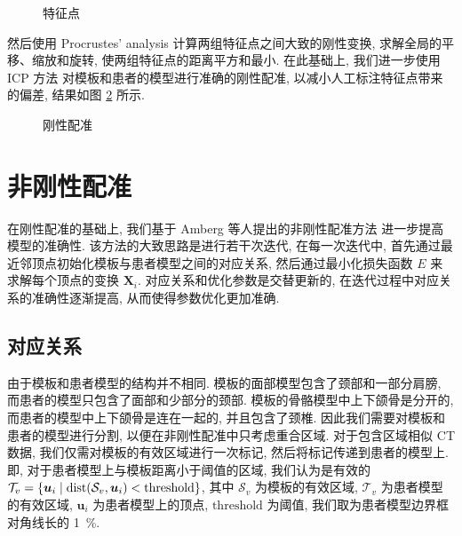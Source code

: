 \begin{figure}
  \centering
  \caption{特征点}
  \label{fig:landmarks}
\end{figure}

然后使用 Procrustes' analysis  计算两组特征点之间大致的刚性变换, 求解全局的平移、缩放和旋转, 使两组特征点的距离平方和最小.
在此基础上, 我们进一步使用 ICP 方法  对模板和患者的模型进行准确的刚性配准, 以减小人工标注特征点带来的偏差, 结果如图 \ref{fig:align} 所示.

\begin{figure}
  \centering
  \caption{刚性配准}
  \label{fig:align}
\end{figure}

\section{非刚性配准}

在刚性配准的基础上, 我们基于 Amberg 等人提出的非刚性配准方法 \cite{ambergOptimalStepNonrigid2007} 进一步提高模型的准确性.
该方法的大致思路是进行若干次迭代, 在每一次迭代中, 首先通过最近邻顶点初始化模板与患者模型之间的对应关系, 然后通过最小化损失函数 $E$ 来求解每个顶点的变换 $\bm{X}_i$.
对应关系和优化参数是交替更新的, 在迭代过程中对应关系的准确性逐渐提高, 从而使得参数优化更加准确.

\subsection{对应关系}

由于模板和患者模型的结构并不相同.
模板的面部模型包含了颈部和一部分肩膀, 而患者的模型只包含了面部和少部分的颈部.
模板的骨骼模型中上下颌骨是分开的, 而患者的模型中上下颌骨是连在一起的, 并且包含了颈椎.
因此我们需要对模板和患者的模型进行分割, 以便在非刚性配准中只考虑重合区域.
对于包含区域相似 CT 数据, 我们仅需对模板的有效区域进行一次标记, 然后将标记传递到患者的模型上.
即, 对于患者模型上与模板距离小于阈值的区域, 我们认为是有效的 $\mathcal{T}_v = \Bqty{\bm{u}_i \mid \dist(\mathcal{S}_v, \bm{u}_i) < \mathrm{threshold}}$, 其中 $\mathcal{S}_v$ 为模板的有效区域, $\mathcal{T}_v$ 为患者模型的有效区域, $\bm{u}_i$ 为患者模型上的顶点, $\mathrm{threshold}$ 为阈值, 我们取为患者模型边界框对角线长的 \SI{1}{\percent}.

